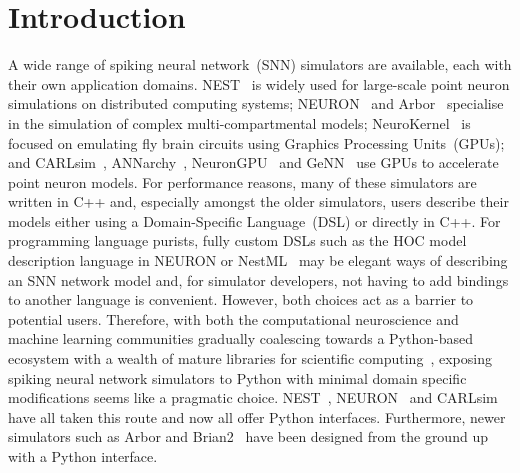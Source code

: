 \documentclass[utf8]{frontiersSCNS} %
\begin{document}
\section{Introduction}
A wide range of spiking neural network~(SNN) simulators are available, each with their own application domains. 
NEST~\citep{Gewaltig2007} is widely used for large-scale point neuron simulations on distributed computing systems; NEURON~\citep{carnevale2006neuron} and Arbor~\citep{Akar2019} specialise in the simulation of complex multi-compartmental models; NeuroKernel~\citep{Givon2016} is focused on emulating fly brain circuits using Graphics Processing Units~(GPUs); and CARLsim~\citep{Chou2018}, ANNarchy~\citep{Dinkelbach2015}, NeuronGPU~\citep{Golosio2021} and GeNN~\citep{Yavuz2016} use GPUs to accelerate point neuron models. 
For performance reasons, many of these simulators are written in C++ and, especially amongst the older simulators, users describe their models either using a Domain-Specific Language~(DSL) or directly in C++.
For programming language purists, fully custom DSLs such as the HOC model description language in NEURON \citep{carnevale2006neuron} or NestML~\citep{nestml} may be elegant ways of describing an SNN network model and, for simulator developers, not having to add bindings to another language is convenient.
However, both choices act as a barrier to potential users.
Therefore, with both the computational neuroscience and machine learning communities gradually coalescing towards a Python-based ecosystem with a wealth of mature libraries for scientific computing~\citep{Hunter2007,VanDerWalt2011,Millman2011}, exposing spiking neural network simulators to Python with minimal domain specific modifications seems like a pragmatic choice.
NEST~\citep{Eppler2009}, NEURON~\citep{Hines2009} and CARLsim~\citep{Balaji2020} have all taken this route and now all offer Python interfaces.
Furthermore, newer simulators such as Arbor and Brian2~\citep{Stimberg2019} have been designed from the ground up with a Python interface.
\end{document}
